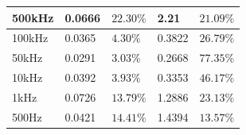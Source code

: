 \documentclass{article}
\begin{document}
\begin{table}[H]
\begin{tabular}{|l|l|l|l|l|}
		500kHz    & 0.0666                                                                                  & $22.30\%$                                                                                          & 2.21                                                                                            & $21.09\%$                                                                                          \\ \hline
		100kHz    & 0.0365                                                                                  & $4.30\%$                                                                                           & 0.3822                                                                                          & $26.79\%$                                                                                          \\ \hline
		50kHz     & 0.0291                                                                                  & $3.03\%$                                                                                           & 0.2668                                                                                          & $77.35\%$                                                                                          \\ \hline
		10kHz     & 0.0392                                                                                  & $3.93\%$                                                                                           & 0.3353                                                                                          & $46.17\%$                                                                                          \\ \hline
		1kHz      & 0.0726                                                                                  & $13.79\%$                                                                                          & 1.2886                                                                                          & $23.13\%$                                                                                          \\ \hline
		500Hz     & 0.0421                                                                                  & $14.41\%$                                                                                          & 1.4394                                                                                          & $13.57\%$                                                                                          \\ \hline
	\end{tabular}
\end{table}
\end{document}
